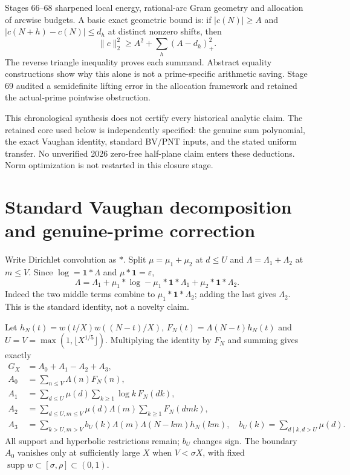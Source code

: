 \documentclass[11pt,a4paper]{article}
\begin{document}
Stages 66--68 sharpened local energy, rational-arc Gram geometry and allocation of arcwise budgets. A basic exact geometric bound is: if $|c(N)|\ge A$ and $|c(N+h)-c(N)|\le d_h$ at distinct nonzero shifts, then
\[
 \|c\|_2^2\ge A^2+\sum_h(A-d_h)_+^2.
\]
The reverse triangle inequality proves each summand. Abstract equality constructions show why this alone is not a prime-specific arithmetic saving. Stage 69 audited a semidefinite lifting error in the allocation framework and retained the actual-prime pointwise obstruction.

This chronological synthesis does not certify every historical analytic claim. The retained core used below is independently specified: the genuine sum polynomial, the exact Vaughan identity, standard BV/PNT inputs, and the stated uniform transfer. No unverified 2026 zero-free half-plane claim enters these deductions. Norm optimization is not restarted in this closure stage.
\newpage
\section{Standard Vaughan decomposition and genuine-prime correction}
Write Dirichlet convolution as $*$. Split $\mu=\mu_1+\mu_2$ at $d\le U$ and $\Lambda=\Lambda_1+\Lambda_2$ at $m\le V$. Since $\log=\mathbf1*\Lambda$ and $\mu*\mathbf1=\varepsilon$,
\[
 \Lambda=\Lambda_1+\mu_1*\log-\mu_1*\mathbf1*\Lambda_1
              +\mu_2*\mathbf1*\Lambda_2.
\]
Indeed the two middle terms combine to $\mu_1*\mathbf1*\Lambda_2$; adding the last gives $\Lambda_2$. This is the standard identity, not a novelty claim.

Let $h_N(t)=w(t/X)w((N-t)/X)$, $F_N(t)=\Lambda(N-t)h_N(t)$ and $U=V=\max(1,\lfloor X^{1/5}\rfloor)$. Multiplying the identity by $F_N$ and summing gives exactly
\begin{align*}
 G_X&=A_0+A_1-A_2+A_3,\\
 A_0&=\sum_{n\le V}\Lambda(n)F_N(n),\\
 A_1&=\sum_{d\le U}\mu(d)\sum_{k\ge1}\log k\,F_N(dk),\\
 A_2&=\sum_{d\le U,m\le V}\mu(d)\Lambda(m)\sum_{k\ge1}F_N(dmk),\\
 A_3&=\sum_{k>U,m>V}b_U(k)\Lambda(m)\Lambda(N-km)h_N(km),
 \quad b_U(k)=\sum_{d\mid k,d>U}\mu(d).
\end{align*}
All support and hyperbolic restrictions remain; $b_U$ changes sign. The boundary $A_0$ vanishes only at sufficiently large $X$ when $V<\sigma X$, with fixed $\operatorname{supp}w\subset[\sigma,\rho]\subset(0,1)$.
\end{document}
